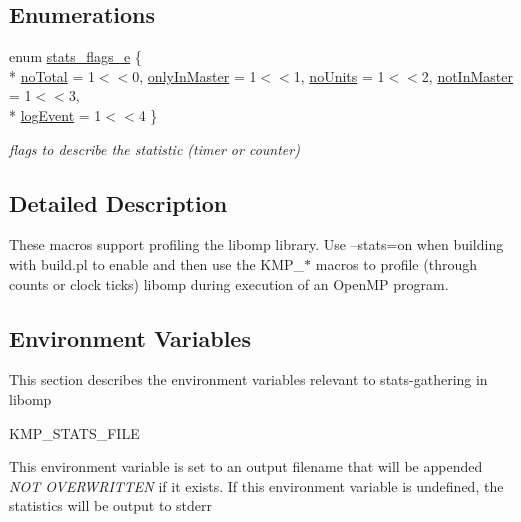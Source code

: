 \subsection*{Enumerations}
\begin{DoxyCompactItemize}
\item 
enum \hyperlink{group__STATS__GATHERING_ga438c2840cc2d516238ea3eb0f4c116b3}{stats\-\_\-flags\-\_\-e} \{ \\*
\hyperlink{group__STATS__GATHERING_gga438c2840cc2d516238ea3eb0f4c116b3ab0da7f248271bb150e59d37370c799b7}{no\-Total} = 1$<$$<$0, 
\hyperlink{group__STATS__GATHERING_gga438c2840cc2d516238ea3eb0f4c116b3ab1b2cd818808a4ee2cc1720286fbc51d}{only\-In\-Master} = 1$<$$<$1, 
\hyperlink{group__STATS__GATHERING_gga438c2840cc2d516238ea3eb0f4c116b3a1c30b5719af4df0bdc7206f20559c6dc}{no\-Units} = 1$<$$<$2, 
\hyperlink{group__STATS__GATHERING_gga438c2840cc2d516238ea3eb0f4c116b3a0939773e208cb608fe78bc80a4197523}{not\-In\-Master} = 1$<$$<$3, 
\\*
\hyperlink{group__STATS__GATHERING_gga438c2840cc2d516238ea3eb0f4c116b3a53d50e56126850e531164b0bb1848c5e}{log\-Event} = 1$<$$<$4
 \}
\begin{DoxyCompactList}\small\item\em flags to describe the statistic (timer or counter) \end{DoxyCompactList}\end{DoxyCompactItemize}


\subsection{Detailed Description}
These macros support profiling the libomp library. Use --stats=on when building with build.\-pl to enable and then use the K\-M\-P\-\_\-$\ast$ macros to profile (through counts or clock ticks) libomp during execution of an Open\-M\-P program.\hypertarget{group__STATS__GATHERING_sec_stats_env_vars}{}\subsection{Environment Variables}\label{group__STATS__GATHERING_sec_stats_env_vars}
This section describes the environment variables relevant to stats-\/gathering in libomp


\begin{DoxyCode}
KMP\_STATS\_FILE
\end{DoxyCode}
 This environment variable is set to an output filename that will be appended {\itshape N\-O\-T O\-V\-E\-R\-W\-R\-I\-T\-T\-E\-N} if it exists. If this environment variable is undefined, the statistics will be output to stderr



